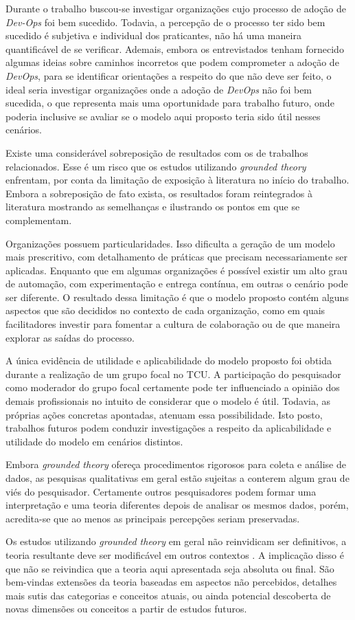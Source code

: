 Durante o trabalho buscou-se investigar organizações cujo processo de
adoção de {\it Dev-Ops} foi bem sucedido. Todavia, a percepção de o processo ter
sido bem sucedido é subjetiva e individual dos praticantes, não há uma maneira
quantificável de se verificar. Ademais, embora os entrevistados tenham fornecido algumas
ideias sobre caminhos incorretos que podem comprometer a adoção de {\it DevOps},
para se identificar orientações a respeito do que não deve ser feito, o ideal
seria investigar organizações onde a adoção de {\it DevOps} não foi bem
sucedida, o que representa mais uma oportunidade para trabalho futuro, onde
poderia inclusive se avaliar se o modelo aqui proposto teria sido útil nesses
cenários.

Existe uma considerável sobreposição de resultados com os de trabalhos
relacionados. Esse é um risco que os estudos utilizando {\it grounded theory}
enfrentam, por conta da limitação de exposição à literatura no início do
trabalho. Embora a sobreposição de fato exista, os resultados foram reintegrados
à literatura mostrando as semelhanças e ilustrando os pontos em que se
complementam.

Organizações possuem particularidades. Isso dificulta a geração de um
modelo mais prescritivo, com detalhamento de práticas que precisam
necessariamente ser aplicadas. Enquanto que em algumas organizações é possível
existir um alto grau de automação, com experimentação e entrega contínua, em
outras o cenário pode ser diferente. O resultado dessa limitação é que o modelo
proposto contém alguns aspectos que são decididos no contexto de cada
organização, como em quais facilitadores investir para fomentar a cultura de
colaboração ou de que maneira explorar as saídas do processo.

A única evidência de utilidade e aplicabilidade do modelo proposto foi
obtida durante a realização de um grupo focal no \acrshort{TCU}. A participação
do pesquisador como moderador do grupo focal certamente pode ter influenciado
a opinião dos demais profissionais no intuito de considerar que o modelo é útil.
Todavia, as próprias ações concretas apontadas, atenuam essa possibilidade. Isto
posto, trabalhos futuros podem conduzir investigações a respeito da
aplicabilidade e utilidade do modelo em cenários distintos.

Embora {\it grounded theory} ofereça procedimentos rigorosos para coleta e
análise de dados, as pesquisas qualitativas em geral estão sujeitas a conterem
algum grau de viés do pesquisador. Certamente outros pesquisadores podem formar
uma interpretação e uma teoria diferentes depois de analisar os mesmos dados,
porém, acredita-se que ao menos as principais percepções seriam preservadas.

Os estudos utilizando {\it grounded theory} em geral não reinvidicam ser
definitivos, a teoria resultante deve ser modificável em outros contextos \cite{hoda2012developing}.
A implicação disso é que não se reivindica que a teoria aqui apresentada seja
absoluta ou final. São bem-vindas extensões da teoria baseadas em aspectos não
percebidos, detalhes mais sutis das categorias e conceitos atuais, ou ainda
potencial descoberta de novas dimensões ou conceitos a partir de estudos
futuros.
